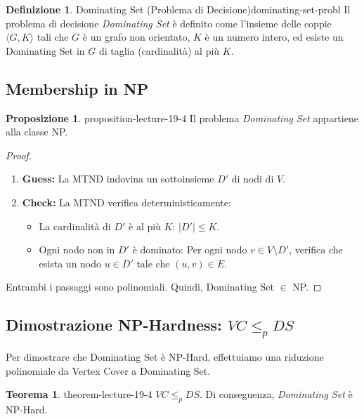 \documentclass[a4paper]{article}
\theoremstyle{definition} %
\newtheorem{theorem}{Teorema}
[section]
\newtheorem{definition}{Definizione}[section]
\newtheorem{proposition}{Proposizione}[section]
\theoremstyle{definition} %
\begin{document}
\begin{definition}{Dominating Set (Problema di Decisione)}{dominating-set-probl}
Il problema di decisione \emph{Dominating Set} è definito come l'insieme delle coppie $\langle G, K \rangle$ tali che $G$ è un grafo non orientato, $K$ è un numero intero, ed esiste un Dominating Set in $G$ di taglia (cardinalità) al più $K$.
\end{definition}

\subsection{Membership in NP}

\begin{proposition}{}{{ proposition-lecture-19-4 }}
Il problema \emph{Dominating Set} appartiene alla classe NP.
\end{proposition}

\begin{proof}
\begin{enumerate}
    \item \textbf{Guess:} La MTND indovina un sottoinsieme $D'$ di nodi di $V$.
    \item \textbf{Check:} La MTND verifica deterministicamente:
    \begin{itemize}
        \item La cardinalità di $D'$ è al più $K$: $|D'| \le K$.
        \item Ogni nodo non in $D'$ è dominato: Per ogni nodo $v \in V \setminus D'$, verifica che esista un nodo $u \in D'$ tale che $(u, v) \in E$.
    \end{itemize}
\end{enumerate}
Entrambi i passaggi sono polinomiali. Quindi, Dominating Set $\in$ NP.
\end{proof}

\subsection{Dimostrazione NP-Hardness: $VC \le_p DS$}

Per dimostrare che Dominating Set è NP-Hard, effettuiamo una riduzione polinomiale da Vertex Cover a Dominating Set.

\begin{theorem}{}{{ theorem-lecture-19-4 }}
$VC \le_p DS$. Di conseguenza, \emph{Dominating Set} è NP-Hard.
\end{theorem}
\end{document}
